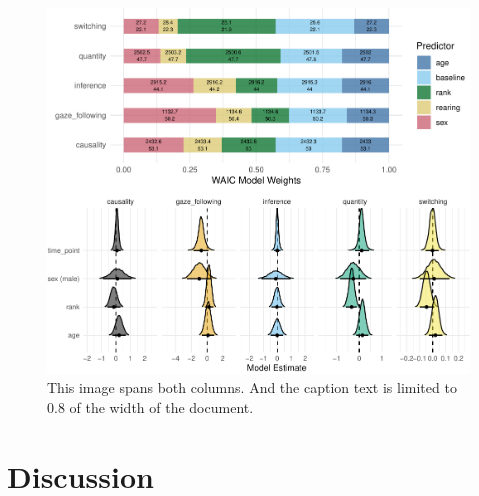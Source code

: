 \documentclass[10pt, letterpaper]{article}
\newenvironment{CodeChunk}{}{}
\begin{document}
\begin{CodeChunk}
\begin{figure}[h]

{\centering \includegraphics{figs/2-col-image2-1} 

}

\caption[This image spans both columns]{This image spans both columns. And the caption text is limited to 0.8 of the width of the document.}\label{fig:2-col-image2}
\end{figure}
\end{CodeChunk}

\hypertarget{discussion}{%
\section{Discussion}\label{discussion}}
\end{document}
